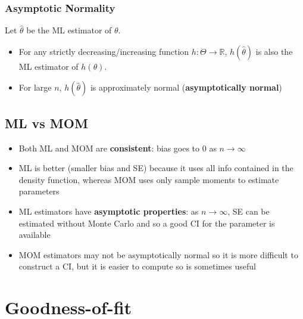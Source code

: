 \documentclass{article}
\begin{document}
\begin{multicols}{2}
\subsubsection{Asymptotic Normality}
Let $\hat{\theta}$ be the ML estimator of $\theta$.
\begin{itemize}
	\item For any strictly decreasing/increasing function $h:\Theta \rightarrow \mathbb{R}$, $h(\hat{\theta})$ is also the ML estimator of $h(\theta)$.
	\item For large $n$, $h(\hat{\theta})$ is approximately normal (\textbf{asymptotically normal})
\end{itemize}

\subsection{ML vs MOM}
\begin{itemize}
	\item Both ML and MOM are \textbf{consistent}: bias goes to 0 as $n\rightarrow \infty$
	\item ML is better (smaller bias and SE) because it uses all info contained in the density function, whereas MOM uses only sample moments to estimate parameters
	\item ML estimators have \textbf{asymptotic properties}: as $n\rightarrow \infty$, SE can be estimated without Monte Carlo and so a good CI for the parameter is available
	\item MOM estimators may not be asymptotically normal so it is more difficult to construct a CI, but it is easier to compute so is sometimes useful
\end{itemize}

\section{Goodness-of-fit}

\end{multicols}
\end{document}
